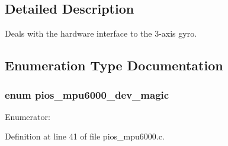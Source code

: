 \subsection{\-Detailed \-Description}
\-Deals with the hardware interface to the 3-\/axis gyro. 

\subsection{\-Enumeration \-Type \-Documentation}
\hypertarget{group___p_i_o_s___m_p_u6000_gacec1373b8d76d996eacbadde2698c1ee}{
\subsubsection[{pios\-\_\-mpu6000\-\_\-dev\-\_\-magic}]{\setlength{\rightskip}{0pt plus 5cm}enum {\bf pios\-\_\-mpu6000\-\_\-dev\-\_\-magic}}}\label{group___p_i_o_s___m_p_u6000_gacec1373b8d76d996eacbadde2698c1ee}
\begin{Desc}
\item[\-Enumerator\-: ]\par
\begin{description}
\item[{\em 
\hypertarget{group___p_i_o_s___m_p_u6000_ggacec1373b8d76d996eacbadde2698c1eea5819766babadd675342ed58f91a0d1fd}{\-P\-I\-O\-S\-\_\-\-M\-P\-U6000\-\_\-\-D\-E\-V\-\_\-\-M\-A\-G\-I\-C}\label{group___p_i_o_s___m_p_u6000_ggacec1373b8d76d996eacbadde2698c1eea5819766babadd675342ed58f91a0d1fd}
}]\end{description}
\end{Desc}



\-Definition at line 41 of file pios\-\_\-mpu6000.\-c.



